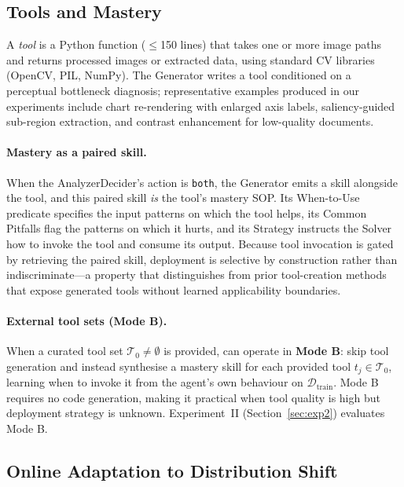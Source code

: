 \subsection{Tools and Mastery}
\label{sec:method_tool}
\label{sec:method_mastery}

A \emph{tool} is a Python function ($\leq$150 lines) that takes one or more image paths and
returns processed images or extracted data, using standard CV libraries (OpenCV, PIL, NumPy).
The Generator writes a tool conditioned on a perceptual bottleneck diagnosis; representative
examples produced in our experiments include chart re-rendering with enlarged axis labels,
saliency-guided sub-region extraction, and contrast enhancement for low-quality documents.

\paragraph{Mastery as a paired skill.}
When the AnalyzerDecider's action is \texttt{both}, the Generator emits a skill alongside the
tool, and this paired skill \emph{is} the tool's mastery SOP. Its When-to-Use predicate
specifies the input patterns on which the tool helps, its Common Pitfalls flag the patterns
on which it hurts, and its Strategy instructs the Solver how to invoke the tool and consume
its output. Because tool invocation is gated by retrieving the paired skill, deployment is
selective by construction rather than indiscriminate---a property that distinguishes
\sysname{} from prior tool-creation methods~\citep{DBLP:conf/emnlp/QianH0Q0J23, DBLP:conf/iclr/Cai00CZ24} that expose
generated tools without learned applicability boundaries.

\paragraph{External tool sets (Mode B).}
When a curated tool set $\mathcal{T}_0 \neq \emptyset$ is provided, \sysname{} can
operate in \textbf{Mode B}: skip tool generation and instead synthesise a mastery skill for
each provided tool $t_j \in \mathcal{T}_0$, learning when to invoke it from the agent's own
behaviour on $\mathcal{D}_{\text{train}}$. Mode B requires no code generation, making it
practical when tool quality is high but deployment strategy is unknown.
Experiment~II (Section~\ref{sec:exp2}) evaluates Mode B.

\subsection{Online Adaptation to Distribution Shift}
\label{sec:method_adaptation}

